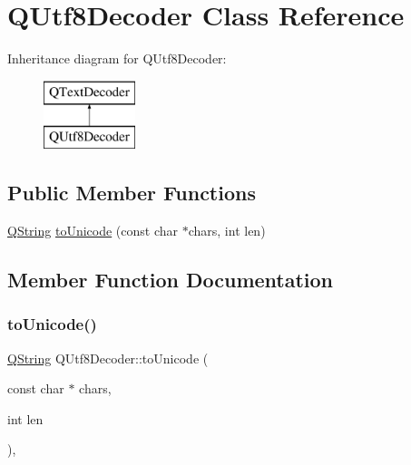 \hypertarget{class_q_utf8_decoder}{}\section{Q\+Utf8\+Decoder Class Reference}
\label{class_q_utf8_decoder}
Inheritance diagram for Q\+Utf8\+Decoder\+:\begin{figure}[H]
\begin{center}
\leavevmode
\includegraphics[height=2.000000cm]{class_q_utf8_decoder}
\end{center}
\end{figure}
\subsection*{Public Member Functions}
\begin{DoxyCompactItemize}
\item 
\mbox{\hyperlink{class_q_string}{Q\+String}} \mbox{\hyperlink{class_q_utf8_decoder_a8e58c9ca286bd2285123d2bbc1489ae3}{to\+Unicode}} (const char $\ast$chars, int len)
\end{DoxyCompactItemize}


\subsection{Member Function Documentation}
\mbox{\label{class_q_utf8_decoder_a8e58c9ca286bd2285123d2bbc1489ae3}} 
\subsubsection{\texorpdfstring{toUnicode()}{toUnicode()}}
{\footnotesize\ttfamily \mbox{\hyperlink{class_q_string}{Q\+String}} Q\+Utf8\+Decoder\+::to\+Unicode (\begin{DoxyParamCaption}\item[{const char $\ast$}]{chars,  }\item[{int}]{len }\end{DoxyParamCaption})\hspace{0.3cm}{\ttfamily [inline]}, {\ttfamily [virtual]}}

